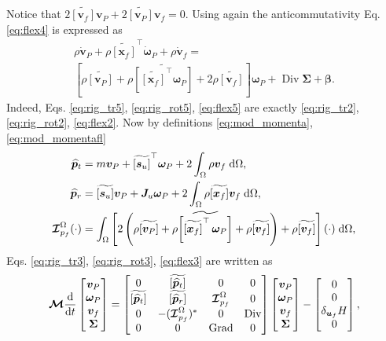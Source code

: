 \documentclass{svjour3}                     %
\DeclareMathOperator*{\Grad}{Grad}
\DeclareMathOperator*{\Div}{Div}
\newcommand{\crmat}[1]{\ensuremath{\widetilde{\left[#1\right]}}}
\begin{document}
Notice that $2 \crmat{\bm{v}_f}\bm{v}_P + 2 \crmat{\bm{v}_P}\bm{v}_f = 0$. Using again the anticommutativity Eq. \eqref{eq:flex4} is expressed as 
\begin{equation}
\label{eq:flex5}
\begin{split}
\rho \dot{\bm{v}}_P + \rho \crmat{\bm{x}_f}^\top \dot{\bm\omega}_P  + \rho \dot{\bm{v}}_f = \\
\left[\rho \crmat{\bm{v}_P} + \rho \crmat{\crmat{\bm{x}_f}^\top \bm\omega_P} + 2 \rho \crmat{\bm{v}_f} \right] \bm\omega_P + \Div{\bm\Sigma} + \bm\beta.
\end{split}
\end{equation}
Indeed, Eqs. \eqref{eq:rig_tr5}, \eqref{eq:rig_rot5}, \eqref{eq:flex5} are exactly \eqref{eq:rig_tr2}, \eqref{eq:rig_rot2}, \eqref{eq:flex2}. Now by definitions \eqref{eq:mod_momenta}, \eqref{eq:mod_momentafl}
\begin{align*}
\widehat{\bm{p}}_t &= m \bm{v}_P + \crmat{\bm{s}_u}^\top \bm\omega_P +2 \int_{\Omega} \rho \bm{v}_f \d{\Omega}, \\
\widehat{\bm{p}}_r &= \crmat{\bm{s}_u} \bm{v}_P + \bm{J}_u \bm\omega_P + 2 \int_{\Omega} \rho \crmat{\bm{x}_f} {\bm{v}}_f \d{\Omega}, \\
\bm{\mathcal{I}}_{p_f}^\Omega(\cdot) &= \int_{\Omega} \left[ 2 \left(\rho \crmat{\bm{v}_P} + \rho \crmat{\crmat{\bm{x}_f}^\top \, \bm\omega_P} +\rho \crmat{\bm{v}_f}\right) + \rho \crmat{\bm{v}_f} \right] (\cdot) \d{\Omega}, 
\end{align*}
Eqs. \eqref{eq:rig_tr3}, \eqref{eq:rig_rot3}, \eqref{eq:flex3} are written as 
\begin{equation}
\bm{\mathcal{M}}
\diff{}{t}
\begin{bmatrix}
\bm{v}_P \\ \bm\omega_P  \\ \bm{v}_f  \\ \bm\Sigma \\
\end{bmatrix} = 
\begin{bmatrix}
0 & \crmat{\widehat{\bm{p}}_t} & 0 & 0 \\
\crmat{\widehat{\bm{p}}_t} & \crmat{\widehat{\bm{p}}_r} & \bm{\mathcal{I}}_{p_f}^\Omega & 0 \\
0 & -(\bm{\mathcal{I}}_{p_f}^\Omega)^* & 0 & \Div \\
0 & 0 & \Grad & 0 \\
\end{bmatrix}
\begin{bmatrix}
\bm{v}_P \\ \bm\omega_P  \\ \bm{v}_f  \\ \bm\Sigma \\
\end{bmatrix} - 
\begin{bmatrix}
0 \\ 0  \\ \delta_{\bm{u}_f}H  \\ 0 \\
\end{bmatrix},
\end{equation} 
\end{document}
